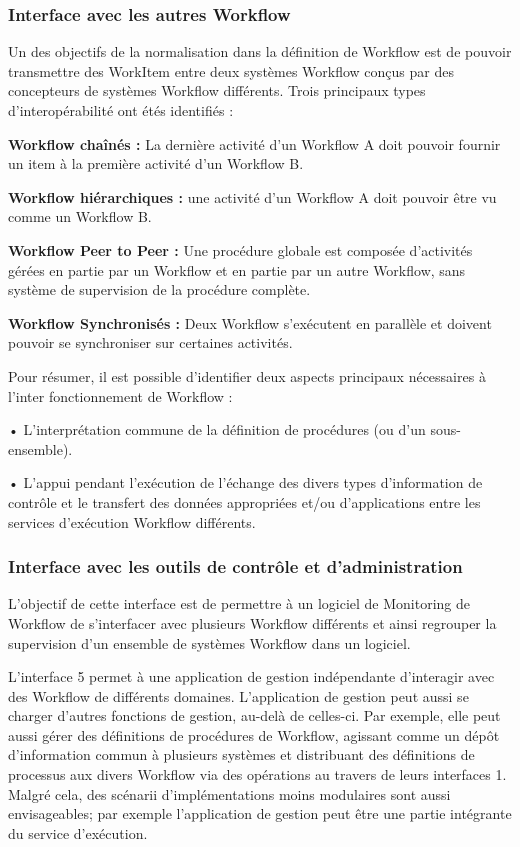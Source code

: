 \subsubsection{Interface avec les autres Workflow }
Un des objectifs de la normalisation dans la définition de Workflow est de pouvoir
transmettre des WorkItem entre deux systèmes Workflow conçus par des concepteurs de systèmes Workflow différents. Trois principaux types d’interopérabilité ont étés identifiés : 

\textbf{Workflow chaînés :} La dernière activité d’un Workflow A doit pouvoir fournir un item à la première activité d’un Workflow B.

\textbf{ Workflow hiérarchiques :} une activité d’un Workflow A doit pouvoir être vu comme un
Workflow B. 

\textbf{Workflow Peer to Peer :} Une procédure globale est composée d’activités gérées en partie par un Workflow et en partie par un autre Workflow, sans système de supervision de
la procédure complète. 

\textbf{Workflow Synchronisés :} Deux Workflow s’exécutent en parallèle et doivent pouvoir se
synchroniser sur certaines activités. 

Pour résumer, il est possible d’identifier deux aspects principaux nécessaires à
l’inter fonctionnement de Workflow :

• L’interprétation commune de la définition de procédures (ou d’un sous-ensemble).

• L’appui pendant l'exécution de l’échange des divers types d'information de contrôle et
le transfert des données appropriées et/ou d'applications entre les services d’exécution Workflow différents.

\subsubsection{Interface avec les outils de contrôle et d’administration }


L’objectif de cette interface est de permettre à un logiciel de Monitoring de Workflow de
s’interfacer avec plusieurs Workflow différents et ainsi regrouper la supervision d’un ensemble de systèmes Workflow dans un logiciel.


L'interface 5 permet à une application de gestion indépendante d’interagir avec des
Workflow de différents domaines. L'application de gestion peut aussi se charger d'autres fonctions de gestion, au-delà de celles-ci. Par exemple, elle peut aussi gérer des définitions de procédures de Workflow, agissant comme un dépôt d’information commun à plusieurs systèmes
et distribuant des définitions de processus aux divers Workflow via des opérations au travers
de leurs interfaces 1.
Malgré cela, des scénarii d’implémentations moins modulaires sont aussi envisageables;
par exemple l'application de gestion peut être une partie intégrante du service d’exécution.  






